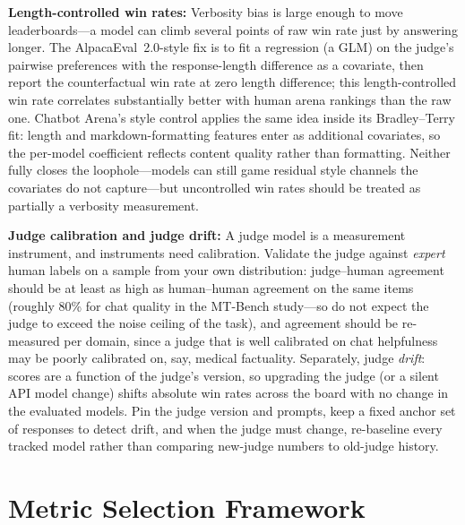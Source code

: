 \textbf{Length-controlled win rates:} Verbosity bias is large enough to move leaderboards---a model can climb several points of raw win rate just by answering longer. The AlpacaEval~2.0-style fix is to fit a regression (a GLM) on the judge's pairwise preferences with the response-length difference as a covariate, then report the counterfactual win rate at zero length difference; this length-controlled win rate correlates substantially better with human arena rankings than the raw one. Chatbot Arena's style control applies the same idea inside its Bradley--Terry fit: length and markdown-formatting features enter as additional covariates, so the per-model coefficient reflects content quality rather than formatting. Neither fully closes the loophole---models can still game residual style channels the covariates do not capture---but uncontrolled win rates should be treated as partially a verbosity measurement.

\textbf{Judge calibration and judge drift:} A judge model is a measurement instrument, and instruments need calibration. Validate the judge against \textit{expert} human labels on a sample from your own distribution: judge--human agreement should be at least as high as human--human agreement on the same items (roughly 80\% for chat quality in the MT-Bench study---so do not expect the judge to exceed the noise ceiling of the task), and agreement should be re-measured per domain, since a judge that is well calibrated on chat helpfulness may be poorly calibrated on, say, medical factuality. Separately, judge \textit{drift}: scores are a function of the judge's version, so upgrading the judge (or a silent API model change) shifts absolute win rates across the board with no change in the evaluated models. Pin the judge version and prompts, keep a fixed anchor set of responses to detect drift, and when the judge must change, re-baseline every tracked model rather than comparing new-judge numbers to old-judge history.

\section{Metric Selection Framework}
\label{sec:metric_selection}

